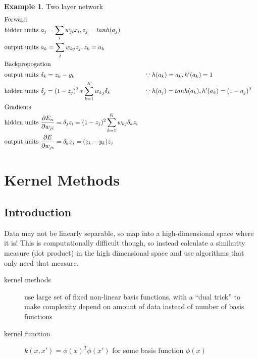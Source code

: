 \documentclass[]{article}
\theoremstyle{definition}
\newtheorem{ex}{Example}[section]
\begin{document}
    \begin{ex}{Two layer network}
       \begin{align*}
           \intertext{Forward}
           &\text{hidden units } a_j = \sum_i w_{ji} x_i, z_j = tanh(a_j) \\
           &\text{output units } a_k = \sum_j w_{kj} z_j, z_k = a_k \\
           \intertext{Backpropogation}
           &\text{output units } \delta_k = z_k - y_k && \because h(a_k) = a_k, h'(a_k) = 1 \\
           &\text{hidden units } \delta_j = (1 - z_j)^2 * \sum_{k=1}^K w_{kj} \delta_k && \because h(a_j) = tanh(a_k), h'(a_k) = (1-a_j)^2 \\
           \intertext{Gradients}
           &\text{hidden units } \frac{\partial E_n}{\partial w_{ji}} = \delta_j z_i = (1-z_j)^2 \sum_{k=1}^K w_{kj} \delta_k z_i \\
           &\text{output units } \frac{\partial E}{\partial w_{ji}}  = \delta_k z_j = (z_k - y_k)z_j \\
       \end{align*}
    \end{ex}

    \section{Kernel Methods}
    \label{sec:kernel_methods}

    \subsection{Introduction}
    Data may not be linearly separable, so map into a high-dimensional space where it is! This is computationally difficult though, so instead calculate a similarity measure (dot product) in the high dimensional space and use algorithms that only need that measure.
    \begin{description}
        \item[kernel methods] use large set of fixed non-linear basis functions, with a ``dual trick'' to make complexity depend on amount of data instead of number of basis functions
        \item[kernel function] $k(x, x') = \phi(x)^T \phi(x') $ for some basis function $\phi(x)$
    \end{description} 
\end{document}
